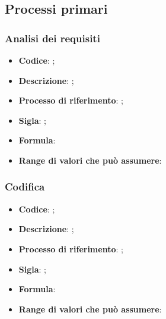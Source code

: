 \subsection{Processi primari}
\subsubsection{Analisi dei requisiti}
\begin{itemize}
	\item \textbf{Codice}: ;
	\item \textbf{Descrizione}: ;
	\item \textbf{Processo di riferimento}: ;
	\item \textbf{Sigla}: ;
	\item \textbf{Formula}: 
	\item \textbf{Range di valori che può assumere}:
\end{itemize}

\subsubsection{Codifica}
\begin{itemize}
	\item \textbf{Codice}: ;
	\item \textbf{Descrizione}: ;
	\item \textbf{Processo di riferimento}: ;
	\item \textbf{Sigla}: ;
	\item \textbf{Formula}: 
	\item \textbf{Range di valori che può assumere}:
\end{itemize}